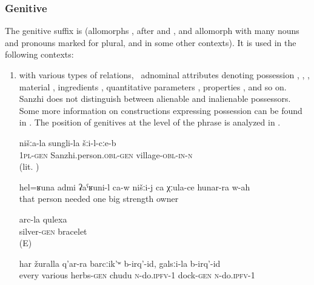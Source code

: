\subsubsection{Genitive}
\label{sssec:Genitive}

The genitive suffix is  (allomorphs ,  after  and , and allomorph  with many nouns and pronouns marked for plural, and in some other contexts). It is used in the following contexts:

\begin{enumerate}
	\item	with various types of relations, \teg\ adnominal attributes denoting possession , , , material , ingredients , quantitative parameters , properties , and so on. Sanzhi does not distinguish between alienable and inalienable possessors. Some more information on constructions expressing possession can be found in . The position of genitives at the level of the phrase is analyzed in .
	\begin{exe}
	
		\ex	\label{ex:in our village of Sanzhi}
		\gll	nišːa-la	sungli-la	šːi-l-cːe-b\\
			\textsc{1pl-gen}	Sanzhi.person.\textsc{obl}-\textsc{gen}	village-\textsc{obl-in}-\textsc{n}\\
		\glt	{} (lit. )
		
		
	\ex	\label{ex:‎We need such a man, one with huge strength}
	\gll	hel=ʁuna	admi	ʡaˁʁuni-l	ca-w	nišːi-j	ca	χːula-ce	hunar-ra w-ah\\
		that	person	needed				one	big	strength	owner\\
	\glt	{}
		
		
		\ex	\label{ex:silver bracelet}
		\gll	arc-la qulexa\\
			silver-\textsc{gen} bracelet\\
		\glt	{} (E)

		\ex	\label{ex:We make chudu from all various herbs, we make it from dock}
		\gll	har	žuralla	q'ar-ra	barcːik'ʷ	b-irq'-id,	galsːi-la	b-irq'-id\\
			every	various	herbs-\textsc{gen}	chudu	\textsc{n}-do.\textsc{ipfv}-1	dock-\textsc{gen}	\textsc{n}-do.\textsc{ipfv}-1\\
		\glt	{}


\end{exe}
\end{enumerate}
